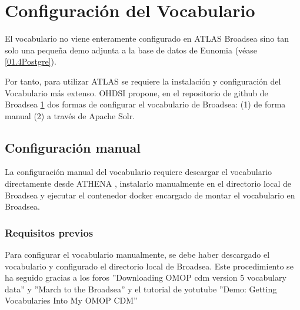 \chapter{Configuración del Vocabulario} \label{cap:05Vocab}

El vocabulario no viene enteramente configurado en ATLAS Broadsea sino tan solo una pequeña demo adjunta a la base de datos de Eunomia (véase \ref{01.4Postgre}).

Por tanto, para utilizar ATLAS se requiere la instalación y configuración del Vocabulario más extenso. OHDSI propone, en el repositorio de github de Broadsea \ref{cap:05Vocab} dos formas de configurar el vocabulario de Broadsea: (1) de forma manual (2) a través de Apache Solr. 

\section{Configuración manual}

La configuración manual del vocabulario requiere descargar el vocabulario directamente desde ATHENA \cite{athena}, instalarlo manualmente en el directorio local de Broadsea y ejecutar el contenedor docker encargado de montar el vocabulario en Broadsea. 

\subsection{Requisitos previos}

Para configurar el vocabulario manualmente,  se debe haber descargado el vocabulario y configurado el directorio local de Broadsea. Este procedimiento se ha seguido gracias a los foros ''Downloading OMOP cdm version 5 vocabulary data'' \cite{forumCDMdownload} y ''March to the Broadsea'' \cite{forumMarchBroadsea} y el tutorial de yotutube ''Demo: Getting Vocabularies Into My OMOP CDM'' \cite{youtubeVocab}

